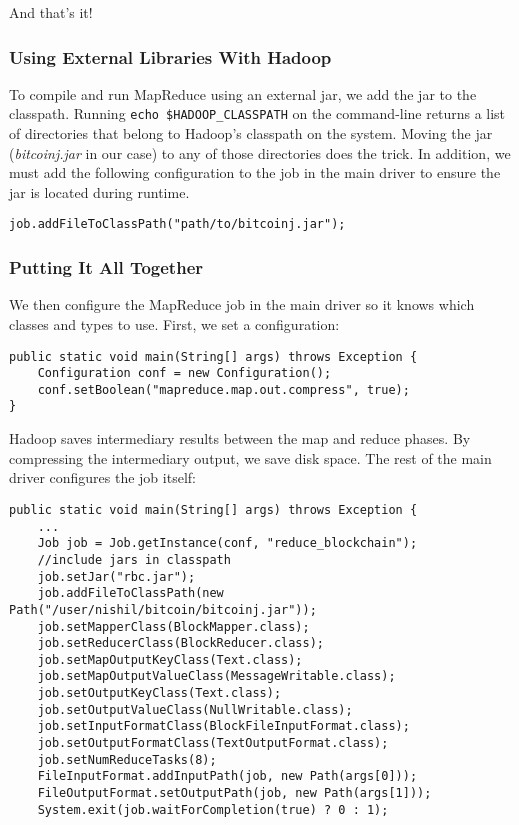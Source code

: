 \documentclass[9pt,twocolumn,twoside]{idsi}
\begin{document}
And that's it!

\subsubsection{Using External Libraries With Hadoop}
To compile and run MapReduce using an external jar, we add the jar to the classpath. Running \lstinline{echo $HADOOP_CLASSPATH} on the command-line returns a list of directories that belong to Hadoop's classpath on the system. Moving the jar (\emph{bitcoinj.jar} in our case) to any of those directories does the trick. In addition, we must add the following configuration to the job in the main driver to ensure the jar is located during runtime.

\begin{lstlisting}
job.addFileToClassPath("path/to/bitcoinj.jar");
\end{lstlisting}

\subsubsection{Putting It All Together}
We then configure the MapReduce job in the main driver so it knows which classes and types to use. First, we set a configuration:

\begin{lstlisting}
public static void main(String[] args) throws Exception {
    Configuration conf = new Configuration();
    conf.setBoolean("mapreduce.map.out.compress", true);
}
\end{lstlisting}

Hadoop saves intermediary results between the map and reduce phases. By compressing the intermediary output, we save disk space. The rest of the main driver configures the job itself:

\begin{lstlisting}
public static void main(String[] args) throws Exception {
    ...
    Job job = Job.getInstance(conf, "reduce_blockchain");
    //include jars in classpath
    job.setJar("rbc.jar");
    job.addFileToClassPath(new Path("/user/nishil/bitcoin/bitcoinj.jar"));
    job.setMapperClass(BlockMapper.class);
    job.setReducerClass(BlockReducer.class);
    job.setMapOutputKeyClass(Text.class);
    job.setMapOutputValueClass(MessageWritable.class);
    job.setOutputKeyClass(Text.class);
    job.setOutputValueClass(NullWritable.class);
    job.setInputFormatClass(BlockFileInputFormat.class);
    job.setOutputFormatClass(TextOutputFormat.class);
    job.setNumReduceTasks(8);
    FileInputFormat.addInputPath(job, new Path(args[0]));
    FileOutputFormat.setOutputPath(job, new Path(args[1]));
    System.exit(job.waitForCompletion(true) ? 0 : 1);
\end{lstlisting}
\end{document}

